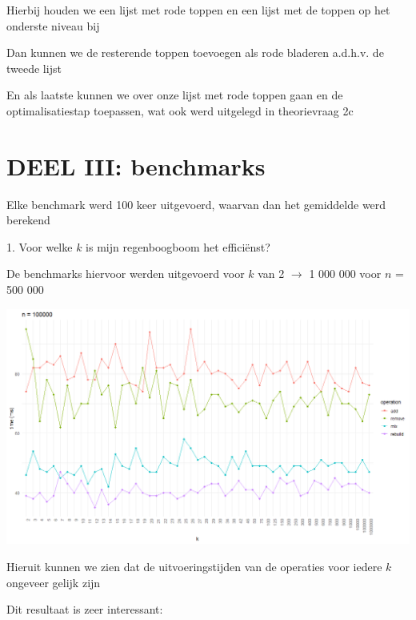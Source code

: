 \documentclass{article}
\begin{document}
Hierbij houden we een lijst met rode toppen en een lijst met de toppen op het onderste niveau bij

Dan kunnen we de resterende toppen toevoegen als rode bladeren a.d.h.v. de tweede lijst

En als laatste kunnen we over onze lijst met rode toppen gaan en de optimalisatiestap toepassen, wat ook werd uitgelegd in theorievraag 2c

\newpage

\section*{\centering DEEL III: benchmarks}
\vspace{1cm}

Elke benchmark werd 100 keer uitgevoerd, waarvan dan het gemiddelde werd berekend

\vspace{0.5cm}

\Large
1. Voor welke $k$ is mijn regenboogboom het efficiënst?

\large

De benchmarks hiervoor werden uitgevoerd voor $k$ van 2 $\rightarrow$ 1 000 000 voor $n$ = 500 000

\vspace{0.2cm}

\includegraphics[width=1\textwidth]{benchmark_rainbow.png}

\vspace{0.2cm}

Hieruit kunnen we zien dat de uitvoeringstijden van de operaties voor iedere $k$ ongeveer gelijk zijn

\vspace{0.2cm}

Dit resultaat is zeer interessant:
\end{document}
